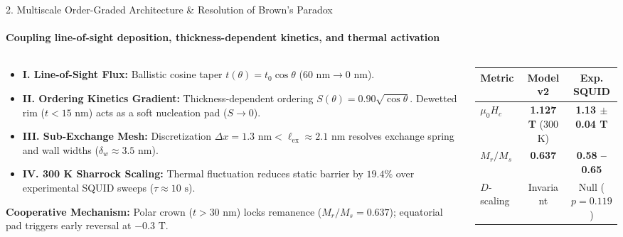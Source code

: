 \documentclass[aspectratio=169, 10pt]{beamer}
\begin{document}
\begin{frame}{2. Multiscale Order-Graded Architecture \& Resolution of Brown's Paradox}
\framesubtitle{Coupling line-of-sight deposition, thickness-dependent kinetics, and thermal activation}

\begin{columns}[T]
  \begin{column}{0.54\textwidth}
    \begin{tcolorbox}[colback=cardbg!5!white, colframe=accentteal, title=\textbf{Four Physical Pillars (Model v2)}, fonttitle=\scriptsize\bfseries, fontupper=\tiny]
      \begin{itemize}\setlength{\itemsep}{1.5pt}
        \item \textbf{I. Line-of-Sight Flux:} Ballistic cosine taper $t(\theta) = t_0\cos\theta$ ($60\text{ nm} \to 0\text{ nm}$).
        \item \textbf{II. Ordering Kinetics Gradient:} Thickness-dependent ordering $S(\theta) = 0.90\sqrt{\cos\theta}$. Dewetted rim ($t < 15\text{ nm}$) acts as a soft nucleation pad ($S \to 0$).
        \item \textbf{III. Sub-Exchange Mesh:} Discretization $\Delta x = 1.3\text{ nm} < \ell_{\mathrm{ex}} \approx 2.1\text{ nm}$ resolves exchange spring and wall widths ($\delta_w \approx 3.5\text{ nm}$).
        \item \textbf{IV. 300 K Sharrock Scaling:} Thermal fluctuation reduces static barrier by $19.4\%$ over experimental SQUID sweeps ($\tau \approx 10\text{ s}$).
      \end{itemize}
      \vspace{2pt}
      \textbf{Cooperative Mechanism:} Polar crown ($t > 30\text{ nm}$) locks remanence ($M_r/M_s = 0.637$); equatorial pad triggers early reversal at $-0.3\text{ T}$.
    \end{tcolorbox}
  \end{column}

  \begin{column}{0.44\textwidth}
    \begin{tcolorbox}[colback=cardbg!5!white, colframe=accentgreen, title=\textbf{Quantitative Match to Experiment}, fonttitle=\scriptsize\bfseries, fontupper=\tiny]
      \begin{tabular}{lcc}
        \toprule
        \textbf{Metric} & \textbf{Model v2} & \textbf{Exp. SQUID} \\
        \midrule
        $\mu_0 H_c$ & \textbf{1.127 T} (300 K) & \textbf{1.13 $\pm$ 0.04 T} \\
        $M_r / M_s$ & \textbf{0.637} & \textbf{0.58 -- 0.65} \\
        $D$-scaling & Invariant & Null ($p = 0.119$) \\
        \bottomrule
      \end{tabular}
      \vspace{4pt}


\end{tcolorbox}
\end{column}
\end{columns}
\end{frame}
\end{document}
